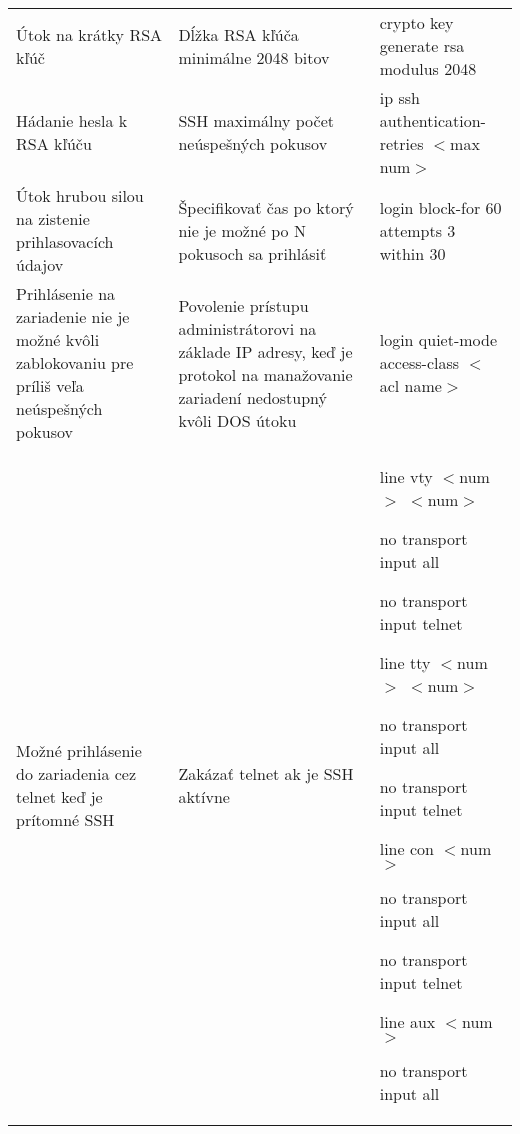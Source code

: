 \begin{longtable}[!htbp]{|L{10em}L{10em}>{\selectfont}L{34em}|}
	
	Útok na krátky RSA kľúč	&Dĺžka RSA kľúča minimálne 2048 bitov	&crypto key generate rsa modulus 2048\\
	
	
	
	
	Hádanie hesla k RSA kľúču	&SSH maximálny počet neúspešných pokusov	&ip 
	ssh authentication-retries $<$max num$>$\\
	
	
	
	
	Útok hrubou silou na zistenie prihlasovacích údajov	&Špecifikovať čas po ktorý nie je možné po N pokusoch sa prihlásiť	&login block-for 60 attempts 3 within 30\\
	
	
	
	
	 Prihlásenie na zariadenie nie je možné kvôli zablokovaniu pre príliš veľa neúspešných pokusov	&Povolenie prístupu administrátorovi na základe IP adresy, keď je protokol na manažovanie zariadení nedostupný kvôli DOS útoku	&login quiet-mode access-class $<$acl name$>$\\
	
	
	
	Možné prihlásenie do zariadenia cez telnet keď je prítomné SSH	&Zakázať telnet ak je SSH aktívne	&line vty $<$num$>$ $<$num$>$
	
	\hspace{0.5em}no transport input all
	
	\hspace{0.5em}no transport input telnet
	\vspace{0.5em}
	
	line tty $<$num$>$ $<$num$>$
	
	\hspace{0.5em}no transport input all
	
	\hspace{0.5em}no transport input telnet
	\vspace{0.5em}
	
	line con $<$num$>$
	
	\hspace{0.5em}no transport input all
	
	\hspace{0.5em}no transport input telnet
	\vspace{0.5em}
	
	line aux $<$num$>$
	
	\hspace{0.5em}no transport input all
	

\end{longtable}
